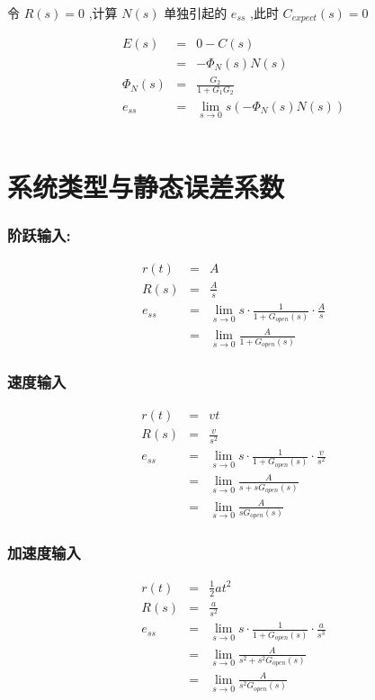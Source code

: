 \documentclass{beamer}
\begin{document}
\begin{frame}
\begin{columns}
\begin{column}{0.5\textwidth}
\begin{block}
令 $R(s)=0$ ,计算 $N(s)$ 单独引起的 $e_{ss}$ ,此时 $C_{expect}(s)=0$ 

\begin{eqnarray*}
E(s) & = & 0-C(s) \\
     & = & -\Phi_N(s)N(s)\\
\Phi_N(s) &=& \frac{G_2}{1+G_1G_2}\\
e_{ss}&=&\lim_{s\rightarrow 0}s(-\Phi_N(s)N(s)) 
\end{eqnarray*}
\end{block}
\end{column}
\end{columns}
\end{frame}
\section{系统类型与静态误差系数}
\label{sec-2}
\begin{frame}
\frametitle{阶跃输入:}
\label{sec-2-1}

\begin{eqnarray*}
r(t) & = & A \\
R(s) & = & \frac{A}{s} \\
e_{ss}&=& \lim_{s\rightarrow 0}s \cdot\frac{1}{1+G_{open}(s)}\cdot\frac{A}{s} \\
      &=& \lim_{s\rightarrow 0}\frac{A}{1+G_{open}(s)}
\end{eqnarray*}
\end{frame}
\begin{frame}
\frametitle{速度输入}
\label{sec-2-2}

\begin{eqnarray*}
r(t) & = & vt \\
R(s) & = & \frac{v}{s^{2}} \\
e_{ss}&=& \lim_{s\rightarrow 0}s \cdot\frac{1}{1+G_{open}(s)}\cdot\frac{v}{s^{2}} \\
      &=& \lim_{s\rightarrow 0}\frac{A}{s+sG_{open}(s)}\\
      &=& \lim_{s\rightarrow 0}\frac{A}{sG_{open}(s)}
\end{eqnarray*}
\end{frame}
\begin{frame}
\frametitle{加速度输入}
\label{sec-2-3}

\begin{eqnarray*}
r(t) & = & \frac{1}{2}at^{2} \\
R(s) & = & \frac{a}{s^{2}} \\
e_{ss}&=& \lim_{s\rightarrow 0}s \cdot\frac{1}{1+G_{open}(s)}\cdot\frac{a}{s^{3}} \\
      &=& \lim_{s\rightarrow 0}\frac{A}{s^{2}+s^{2}G_{open}(s)}\\
      &=& \lim_{s\rightarrow 0}\frac{A}{s^{2}G_{open}(s)}
\end{eqnarray*}
\end{frame}
\end{document}
